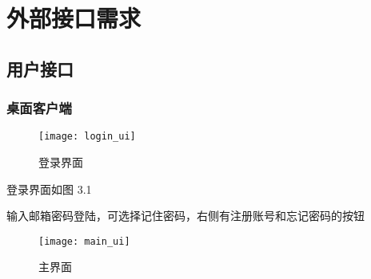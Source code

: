 \section{外部接口需求}
\subsection{用户接口}
% 
% 
% 
% 
% 


\subsubsection{桌面客户端}


\begin{figure}[h]
	\centering
	\texttt{[image: login\_ui]}
	\caption{登录界面} \label{fig:login_ui}
\end{figure}

登录界面如图 3.1

输入邮箱密码登陆，可选择记住密码，右侧有注册账号和忘记密码的按钮

\begin{figure}[h]
	\centering
	\texttt{[image: main\_ui]}
	\caption{主界面} \label{fig:main_ui}
\end{figure}

